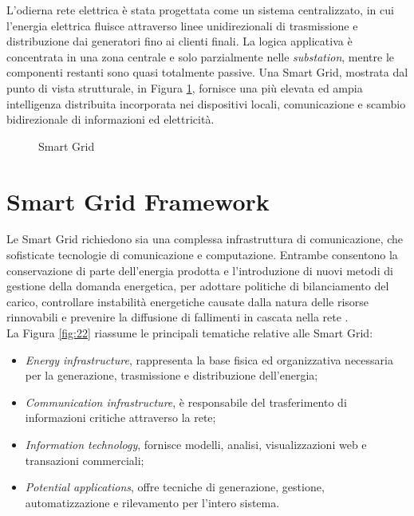 L'odierna rete elettrica è stata progettata come un sistema centralizzato, in cui l'energia elettrica fluisce attraverso linee unidirezionali di trasmissione e distribuzione dai generatori fino ai clienti finali. La logica applicativa è concentrata in una zona centrale e solo parzialmente nelle \emph{substation}, mentre le componenti restanti sono quasi totalmente passive. Una Smart Grid, mostrata dal punto di vista strutturale, in Figura \ref{fig:21}, fornisce una più elevata ed ampia intelligenza distribuita incorporata nei dispositivi locali, comunicazione e scambio bidirezionale di informazioni ed elettricità.

\begin{figure}[h] 
\caption{Smart Grid}\label{fig:21}
\end{figure}

\section{Smart Grid Framework}
Le Smart Grid richiedono sia una complessa infrastruttura di comunicazione, che sofisticate tecnologie di comunicazione e computazione. Entrambe consentono la conservazione di parte dell'energia prodotta e l'introduzione di nuovi metodi di gestione della domanda energetica, per adottare politiche di bilanciamento del carico, controllare instabilità energetiche causate dalla natura delle risorse rinnovabili e prevenire la diffusione di fallimenti in cascata nella rete \cite{gungor}. 
\\ 
La Figura \ref{fig:22} riassume le principali tematiche relative alle Smart Grid:
\begin{itemize}
	\item \emph{Energy infrastructure}, rappresenta la base fisica ed organizzativa necessaria per la generazione, trasmissione e distribuzione dell'energia;
	\item \emph{Communication infrastructure}, è responsabile del trasferimento di informazioni critiche attraverso la rete;
	\item \emph{Information technology}, fornisce modelli, analisi, visualizzazioni web e transazioni commerciali;
	\item \emph{Potential applications}, offre tecniche di generazione, gestione, automatizzazione e rilevamento per l'intero sistema.
\end{itemize} 

